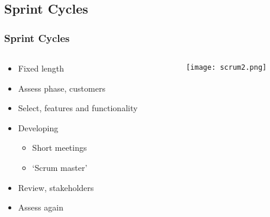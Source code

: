 \documentclass{beamer}
\begin{document}
\subsection{Sprint Cycles}
\begin{frame}
  \frametitle{Sprint Cycles}
  \begin{columns}[T]
    \begin{column}{.5\textwidth}
	  \begin{itemize}
		\item Fixed length
		\item Assess phase, customers
		\item Select, features and functionality
		\item Developing
		\begin{itemize}
		  \item Short meetings
		  \item `Scrum master'
		\end{itemize}
		\item Review, stakeholders
		\item Assess again
	  \end{itemize}
    \end{column}
    \begin{column}{.5\textwidth}
      \texttt{[image: scrum2.png]}
    \end{column}
  \end{columns}
\end{frame}
\end{document}
